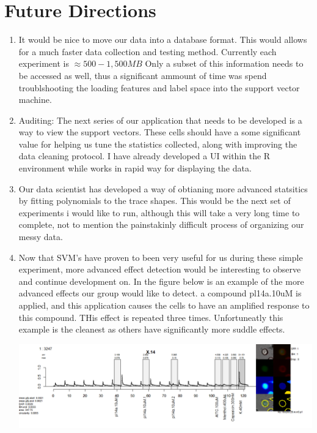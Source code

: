 \documentclass[11pt, fullpage,letterpaper]{article}
\begin{document}
\section{Future Directions}
\begin{enumerate}
\item It would be nice to move our data into a database format. This would allows for a much faster data collection and testing method. Currently each experiment is $\approx 500-1,500 MB$ Only a subset of this information needs to be accessed as well, thus a significant ammount of time was spend troublshooting the loading features and label space into the support vector machine.  

\item Auditing: The next series of our application that needs to be developed is a way to view the support vectors. These cells should have a some significant value for helping us tune the statistics collected, along with improving the data cleaning protocol. I have already developed a UI within the R environment while works in rapid way for displaying the data.

\item Our data scientist has developed a way of obtianing more advanced statsitics by fitting polynomials to the trace shapes. This would be the next set of experiments i would like to run, although this will take a very long time to complete, not to mention the painstakinly difficult process of organizing our messy data.

\item Now that SVM's have proven to been very useful for us during these simple experiment, more advanced effect detection would be interesting to observe and continue development on. In the figure below is an example of the more advanced effects our group would like to detect. a compound pl14a.10uM is applied, and this application causes the cells to have an amplified response to this compound. THis effect is repeated three times.  Unfortuneatly this example is the cleanest as others have significantly more suddle effects.
\newline 
\begin{center}
	\includegraphics[scale=.3]{advanced_detection.png}
\end{center}
\end{enumerate}
\end{document}
